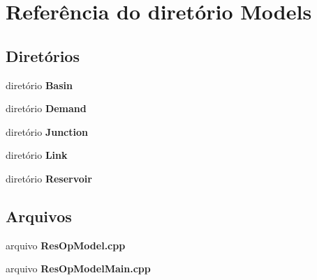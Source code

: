 \section{Referência do diretório Models}
\label{dir_be95d38dba0c332f1908c3cf863bc442}
\subsection*{Diretórios}
\begin{DoxyCompactItemize}
\item 
diretório {\bf Basin}
\item 
diretório {\bf Demand}
\item 
diretório {\bf Junction}
\item 
diretório {\bf Link}
\item 
diretório {\bf Reservoir}
\end{DoxyCompactItemize}
\subsection*{Arquivos}
\begin{DoxyCompactItemize}
\item 
arquivo {\bf Res\+Op\+Model.\+cpp}
\item 
arquivo {\bf Res\+Op\+Model\+Main.\+cpp}
\end{DoxyCompactItemize}
